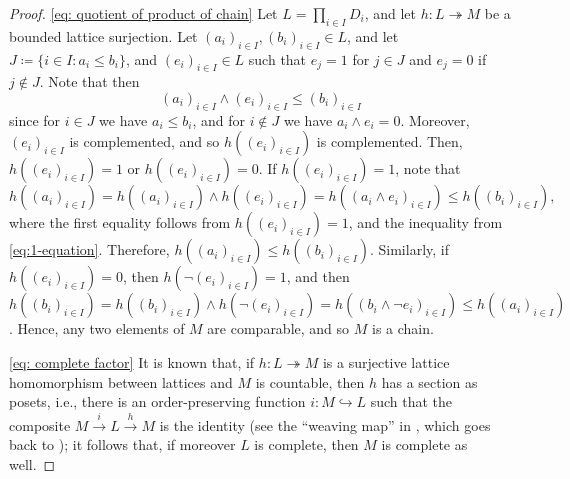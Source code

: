 \documentclass[12pt]{amsart}
\theoremstyle{plain}
\theoremstyle{definition}
\begin{document}
\begin{proof}
    \eqref{eq: quotient of product of chain} 
    Let $L=\prod_{i\in I}D_{i}$, and let $h\colon L\twoheadrightarrow M$ be a bounded lattice surjection. Let $(a_i)_{i\in I},(b_i)_{i\in I}\in L$, and let $J \coloneqq \{ i\in I : a_i\leq b_i\}$, and $(e_i)_{i\in I}\in L$ such that $e_j=1$ for $j\in J$ and $e_j=0$ if $j\notin J$. Note that then
    \begin{equation}
        \label{eq:1-equation}
        (a_{i})_{i\in I}\wedge (e_{i})_{i\in I} \leq (b_{i})_{i\in I}
    \end{equation}
    since for $i\in J$ we have $a_{i}\leq b_{i}$, and for $i\notin J$ we have $a_{i}\wedge e_{i}=0$. Moreover,  $(e_i)_{i\in I}$ is complemented, and so $h((e_i)_{i\in I})$ is complemented. Then, $h((e_i)_{i\in I})=1$ or $h((e_i)_{i\in I})=0$. If $h((e_i)_{i\in I})=1$, note that 
    \[
        h((a_i)_{i\in I})
        =
        h((a_i)_{i\in I})\wedge  h((e_i)_{i\in I})=h ((a_i\wedge e_i)_{i\in I})\leq h((b_i)_{i \in I}),
    \]
    where the first equality follows from $h((e_{i})_{i\in I})=1$, and the inequality from \eqref{eq:1-equation}. Therefore, $h((a_i)_{i \in I})\leq h((b_i)_{i \in I})$. Similarly, if  $h((e_i)_{i\in I})=0$, then $h(\lnot (e_i)_{i \in I}) = 1$, and then $h((b_i)_{i\in I})=h((b_i)_{i\in I})\wedge h(\neg (e_i)_{i\in I})=h ((b_i\wedge \neg e_i)_{i\in I})\leq h((a_i)_{i \in I})$. Hence, any two elements of $M$ are comparable, and so $M$ is a chain.


    \eqref{eq: complete factor} It is known that, if $h \colon L \twoheadrightarrow M$ is a surjective lattice homomorphism between lattices and $M$ is countable, then $h$ has a section as posets, i.e., there is an order-preserving function $i \colon M \hookrightarrow L$ such that the composite $M \xrightarrow{i} L \xrightarrow{h} M$ is the identity (see the ``weaving map'' in \cite[p.~98]{Rival1982}, which goes back to \cite[Thm.~3, p.~35]{Dean1961}); it follows that, if moreover $L$ is complete, then $M$ is complete as well.
\end{proof}
\end{document}
